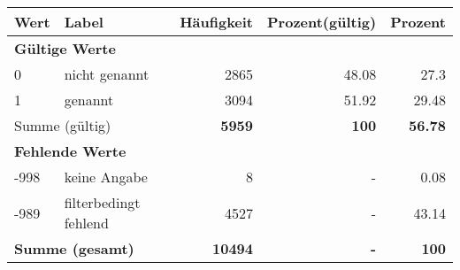      \begin{longtable}{lXrrr}
     \toprule
     \textbf{Wert} & \textbf{Label} & \textbf{Häufigkeit} & \textbf{Prozent(gültig)} & \textbf{Prozent} \\
     \endhead
     \midrule
     \multicolumn{5}{l}{\textbf{Gültige Werte}}\\

     0 &
     \multicolumn{1}{X}{ nicht genannt   } &


       \num{2865} &
       \num[round-mode=places,round-precision=2]{48,08} &
         \num[round-mode=places,round-precision=2]{27,3} \\

     1 &
     \multicolumn{1}{X}{ genannt   } &


       \num{3094} &
       \num[round-mode=places,round-precision=2]{51,92} &
         \num[round-mode=places,round-precision=2]{29,48} \\
     \midrule
     \multicolumn{2}{l}{Summe (gültig)} &
       \textbf{\num{5959}} &
     \textbf{100} &
       \textbf{\num[round-mode=places,round-precision=2]{56,78}} \\
     \multicolumn{5}{l}{\textbf{Fehlende Werte}}\\
       -998 &
       keine Angabe &
         \num{8} &
        - &
         \num[round-mode=places,round-precision=2]{0,08} \\
       -989 &
       filterbedingt fehlend &
         \num{4527} &
        - &
         \num[round-mode=places,round-precision=2]{43,14} \\
     \midrule
     \multicolumn{2}{l}{\textbf{Summe (gesamt)}} &
          \textbf{\num{10494}} &
        \textbf{-} &
        \textbf{100} \\
     \bottomrule
     \end{longtable}
     
